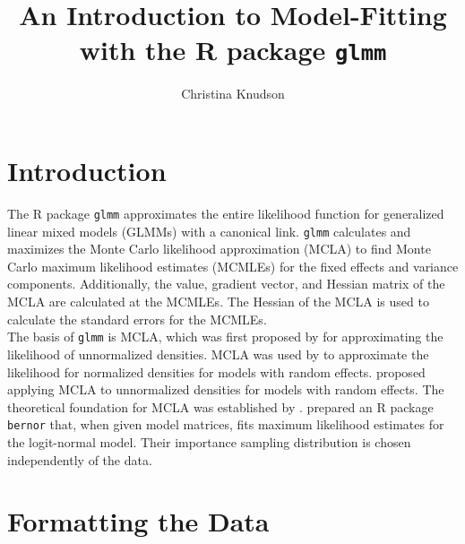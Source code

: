 \documentclass[11pt]{article}\usepackage[]{graphicx}\usepackage[]{color}
\title{An Introduction to Model-Fitting with the R package \texttt{glmm} }
\author{Christina Knudson}
\begin{document}
\maketitle
\setlength\parindent{0pt}
\tableofcontents

\break
\section{Introduction}
The R package \texttt{glmm} approximates the entire likelihood function for generalized linear mixed models (GLMMs) with a canonical link. \texttt{glmm} calculates and maximizes the Monte Carlo likelihood approximation (MCLA) to find Monte Carlo maximum likelihood estimates (MCMLEs) for the fixed effects and variance components. Additionally, the value, gradient vector, and Hessian matrix of the MCLA are calculated at the MCMLEs. The Hessian of the MCLA is used to calculate the standard errors for the MCMLEs. \\

The basis of \texttt{glmm} is MCLA, which was first proposed by \citet{geyer:1990} for approximating the likelihood of unnormalized densities. MCLA was used by \citet{geyer:thom:1992} to approximate the likelihood for normalized densities for models with random effects. \citet{gelf:carl:1993} proposed applying MCLA to unnormalized densities for models with random effects. The theoretical foundation for MCLA was established by \citet{geyer:1994}.  \citet{sung:geyer:2007} prepared an R package \texttt{bernor} that, when given model matrices, fits maximum likelihood estimates for the logit-normal model. Their importance sampling distribution is chosen independently of the data. \\






\section {Formatting the Data}\label{sec:format}
\end{document}

